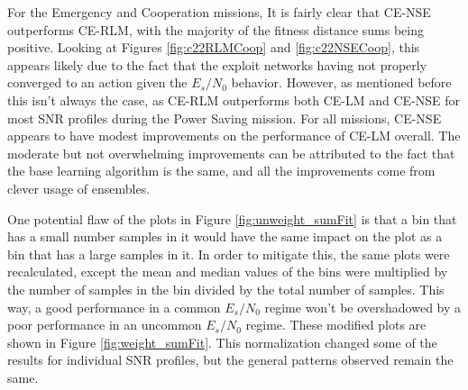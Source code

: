 \par For the Emergency and Cooperation missions, It is fairly clear that CE-NSE outperforms CE-RLM, with the majority of the fitness distance sums being positive. Looking at Figures \ref{fig:c22RLMCoop} and \ref{fig:c22NSECoop}, this appears likely due to the fact that the exploit networks having not properly converged to an action given the $E_s/N_0$ behavior. However, as mentioned before this isn't always the case, as CE-RLM outperforms both CE-LM and CE-NSE for most SNR profiles during the Power Saving mission. For all missions, CE-NSE appears to have modest improvements on the performance of CE-LM overall. The moderate but not overwhelming improvements can be attributed to the fact that the base learning algorithm is the same, and all the improvements come from clever usage of ensembles.


\par One potential flaw of the plots in Figure \ref{fig:unweight_sumFit} is that a bin that has a small number samples in it would have the same impact on the plot as a bin that has a large samples in it. In order to mitigate this, the same plots were recalculated, except the mean and median values of the bins were multiplied by the number of samples in the bin divided by the total number of samples. This way, a good performance in a common $E_s/N_0$ regime won't be overshadowed by a poor performance in an uncommon $E_s/N_0$ regime. These modified plots are shown in Figure \ref{fig:weight_sumFit}. This normalization changed some of the results for individual SNR profiles, but the general patterns observed remain the same.


